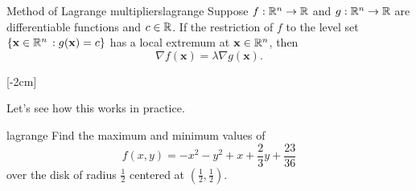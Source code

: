 \documentclass[svgnames]{watsonbook}
\begin{document}
  \begin{theo}{Method of Lagrange multipliers}{lagrange}
    Suppose $f: \mathbb{R}^n \to \mathbb{R}$ and $g:\mathbb{R}^n \to \mathbb{R}$ are differentiable
    functions and $c \in \mathbb{R}$. If the restriction of $f$ to the level
    set $\{\mathbf{x} \in \mathbb{R}^n \,: g(\mathbf{x}) = c\}$ has a local
    extremum at $\mathbf{x} \in \mathbb{R}^n$, then
    \[
      \nabla f (\mathbf{x}) = \lambda \nabla g (\mathbf{x}). 
    \]
  \end{theo} [-2cm]

  Let's see how this works in practice.

  \begin{example}{}{lagrange}
    Find the maximum and minimum values of
    \[f(x,y) = -x^2 - y^2 + x + \frac{2}{3} y + \frac{23}{36}\]
    over the disk of radius $\tfrac{1}{2}$ centered at $\left(
      \tfrac{1}{2}, \tfrac{1}{2}\right)$. 
  \end{example}
\end{document}
